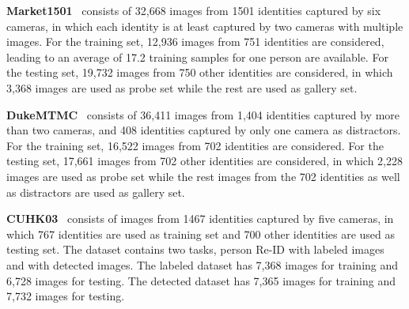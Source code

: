 \documentclass[journal]{IEEEtran}
\begin{document}
\textbf{Market1501}~\cite{zheng2015scalable} consists of 32,668 images from 1501 identities captured by six cameras, in which each identity is at least captured by two cameras with multiple images.
For the training set, 12,936 images from 751 identities are considered, leading to an average of 17.2 training samples for one person are available.
For the testing set, 19,732 images from 750 other identities are considered, in which 3,368 images are used as probe set while the rest are used as gallery set.

\textbf{DukeMTMC}~\cite{Ristani2016Performance} consists of 36,411 images from 1,404 identities captured by more than two cameras, and 408 identities captured by only one camera as distractors.
For the training set, 16,522 images from 702 identities are considered.
For the testing set, 17,661 images from 702 other identities are considered, in which 2,228 images are used as probe set while the rest images from the 702 identities as well as distractors are used as gallery set.

\textbf{CUHK03}~\cite{Li2014DeepReID} consists of images from 1467 identities captured by five cameras, in which 767 identities are used as training set and 700 other identities are used as testing set.
The dataset contains two tasks, person Re-ID with labeled images and with detected images.
The labeled dataset has 7,368 images for training and 6,728 images for testing.
The detected dataset has 7,365 images for training and 7,732 images for testing.
\end{document}
